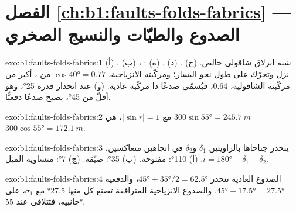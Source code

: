 \section*{الفصل \ref{ch:b1:faults-folds-fabrics} --- الصدوع والطيّات والنسيج الصخري}

\begin{solution}{exo:b1:faults-folds-fabrics:1}
(أ) . (ب) ، شبه انزلاق شاقولي خالص. (ج)  . (د)  . (ه) :
 نزل وتحرّك على طول  نحو اليسار؛ ومركّبته الانزياحية، $\cos\ang{40} = 0.77$ من ، أكبر من مركّبته الشاقولية، $0.64$، فيُسمّى صدعًا  ذا مركّبة عادية.
(و) عند انحدار قدره \ang{25}، وهو أقلّ من \ang{45}، يصبح  صدعًا دفعيًّا.
\end{solution}

\begin{solution}{exo:b1:faults-folds-fabrics:2}
مع $|\sin r| = 1$،  هي $300\sin\ang{55} = \qty{245.7}{m}$ 
$300\cos\ang{55} = \qty{172.1}{m}$.
\end{solution}

\begin{solution}{exo:b1:faults-folds-fabrics:3}
 ينحدر جناحاها بالزاويتين $\delta_1$ و$\delta_2$ في اتجاهين متعاكسين، $\iota = \ang{180} - \delta_1 - \delta_2$. (أ) \ang{110}: مفتوحة.
(ب) \ang{35}: ضيّقة. (ج) \ang{7}: متساوية الميل.
\end{solution}

\begin{solution}{exo:b1:faults-folds-fabrics:4}
الصدوع العادية تنحدر $\ang{45} + \ang{35}/2 = \ang{62.5}$، والدفعية $\ang{45} - \ang{17.5} = \ang{27.5}$. والصدوع الانزياحية المترافقة تصنع كل منها \ang{27.5} مع $\sigma_1$، على جانبيه، فتتلاقى عند \ang{55}.
\end{solution}

